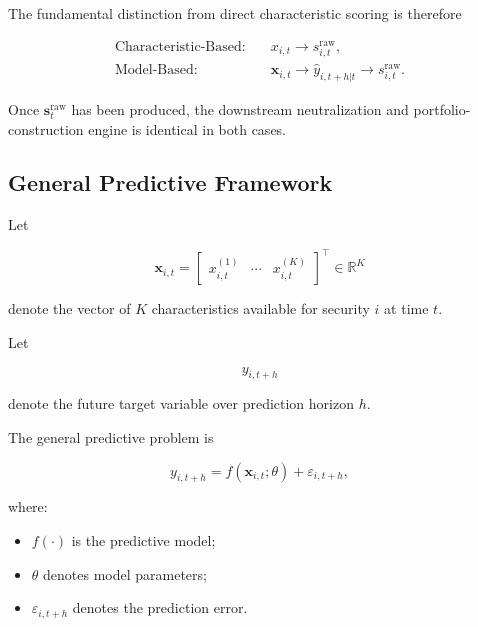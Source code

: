\documentclass[11pt,a4paper]{article}
\begin{document}
The fundamental distinction from direct characteristic scoring is therefore

\begin{equation}
\boxed{
\begin{aligned}
\text{Characteristic-Based:}
&\quad
x_{i,t}
\rightarrow
s_{i,t}^{\mathrm{raw}},
\\[0.15cm]
\text{Model-Based:}
&\quad
\mathbf{x}_{i,t}
\rightarrow
\widehat{y}_{i,t+h|t}
\rightarrow
s_{i,t}^{\mathrm{raw}}.
\end{aligned}
}
\end{equation}

Once $\mathbf{s}_t^{\mathrm{raw}}$ has been produced, the downstream
neutralization and portfolio-construction engine is identical in both cases.


\subsection{General Predictive Framework}
\label{subsec:general_predictive_framework}

Let

\begin{equation}
\mathbf{x}_{i,t}
=
\begin{bmatrix}
x_{i,t}^{(1)}
&
\cdots
&
x_{i,t}^{(K)}
\end{bmatrix}^{\top}
\in
\mathbb{R}^{K}
\end{equation}

denote the vector of $K$ characteristics available for security $i$ at time
$t$.

Let

\begin{equation}
y_{i,t+h}
\end{equation}

denote the future target variable over prediction horizon $h$.

The general predictive problem is

\begin{equation}
\boxed{
y_{i,t+h}
=
f
\left(
\mathbf{x}_{i,t};
\theta
\right)
+
\varepsilon_{i,t+h},
}
\end{equation}

where:

\begin{itemize}
    \item $f(\cdot)$ is the predictive model;
    \item $\theta$ denotes model parameters;
    \item $\varepsilon_{i,t+h}$ denotes the prediction error.
\end{itemize}
\end{document}
